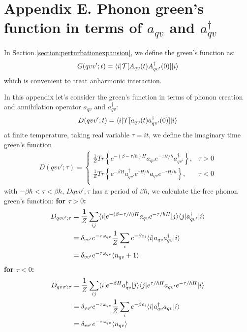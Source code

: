\documentclass{article}
\begin{document}
\pagebreak
\section*{Appendix E. Phonon green's function in terms of $a_{qv}$ and $a_{qv}^{\dagger}$}
In Section.\ref{section:perturbationexpansion}, we define the green's function as:
\begin{align}
    G(qvv';t) = \langle i | \mathcal{T}[A_{qv}(t)A_{qv'}^{\dagger}(0)]| i \rangle \notag
\end{align}
which is convenient to treat anharmonic interaction. 

In this appendix let's consider 
the green's function in terms of phonon creation and annihilation operator $a_{qv}$ and $a^{\dagger}_{qv}$:
\begin{equation}
    D(qvv';t) = \langle i | \mathcal{T}[a_{qv}(t)a_{qv'}^{\dagger}(0)]| i \rangle \notag
\end{equation}
at finite temperature, taking real variable $\tau = it$, we define the imaginary time green's function
\begin{align}
    D(qvv';\tau) = 
    \begin{cases}
        \frac{1}{Z} Tr\left\{ e^{-(\beta-\tau/\hbar)H} a_{qv} e^{-\tau H/\hbar } a_{qv'}^{\dagger} \right\}, &\tau > 0 \\
        \frac{1}{Z} Tr\left\{ e^{-\beta H} a_{qv'}^{\dagger} e^{\tau H/\hbar } a_{qv} e^{- \tau H/\hbar } \right\}, &\tau < 0 \\
    \end{cases}
\end{align}
with $-\beta\hbar < \tau < \beta \hbar$,
$D{qvv';\tau}$ has a period of $\beta\hbar$, we calculate the free phonon green's function:
\textbf{for $\tau > 0$:}
\begin{align}
    D_{qvv';\tau} &= \frac{1}{Z} \sum_{ij} 
                    \langle i | e^{-(\beta-\tau/\hbar)H} a_{qv} e^{-\tau/\hbar H} | j\rangle \langle j | a^{\dagger}_{qv'} | i \rangle \notag \\
                  &= \delta_{vv'} e^{-\tau\omega_{qv}} \frac{1}{Z} \sum_i e^{-\beta \varepsilon_i} \langle i | a_{qv} a^{\dagger}_{qv} | i\rangle \notag \\
                  &= \delta_{vv'} e^{-\tau\omega_{qv}} \langle n_{qv} + 1 \rangle 
\end{align}
\textbf{for $\tau < 0$:}
\begin{align}
    D_{qvv';\tau} &= \frac{1}{Z} \sum_{ij} 
                    \langle i | e^{-\beta H} a^{\dagger}_{qv} | j \rangle \langle j | e^{\tau/\hbar H}a_{qv'}e^{-\tau/\hbar H} | i \rangle \notag \\
                  &= \delta_{vv'} e^{-\tau\omega_{qv}} \frac{1}{Z} \sum_i e^{-\beta \varepsilon_i} \langle i | a^{\dagger}_{qv} a_{qv} | i\rangle \notag \\
                  &= \delta_{vv'} e^{-\tau\omega_{qv}} \langle n_{qv} \rangle 
\end{align}
\end{document}
